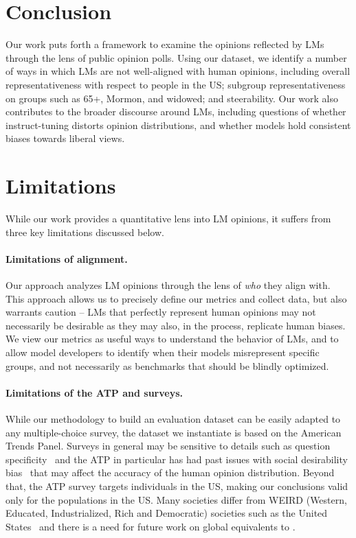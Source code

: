 \section{Conclusion}
\label{sec:discussion}

Our work puts forth a framework to examine the opinions reflected by LMs through the lens of public opinion polls. Using our \bname dataset, we identify a number of ways in which LMs are not well-aligned with human opinions, including overall representativeness with respect to people in the US; subgroup representativeness on groups such as 65+, Mormon, and widowed; and steerability. Our work also contributes to the broader discourse around LMs, including questions of whether instruct-tuning distorts opinion distributions, and whether models hold consistent biases towards liberal views.

\section{Limitations}

While our work provides a quantitative lens into LM opinions, it suffers from three key limitations discussed below.

\paragraph{Limitations of alignment.} Our approach analyzes LM opinions through the lens of \emph{who} they align with. This approach allows us to precisely define our metrics and collect data, but also warrants caution -- LMs that perfectly represent human opinions may not necessarily be desirable as they may also, in the process, replicate human biases. We view our metrics as useful ways to understand the behavior of LMs, and to allow model developers to identify when their models misrepresent specific groups, and not necessarily as benchmarks that should be blindly optimized.

\paragraph{Limitations of the ATP and surveys.} While our methodology to build an evaluation dataset can be easily adapted to any multiple-choice survey, the \bname dataset we instantiate is based on the American Trends Panel.
Surveys in general may be sensitive to details such as question specificity~\citep{berinsky2017measuring} and the ATP in particular has had past issues with social desirability bias~\citep{yan2021consequences}
that may affect the accuracy of the human opinion distribution. Beyond that, the ATP survey targets individuals in the US, making our conclusions valid only for the populations in the US. Many societies differ from WEIRD (Western, Educated, Industrialized, Rich and Democratic) societies such as the United States~\citep{henrich2010weirdest} and there is a need for future work on global equivalents to \bname.

